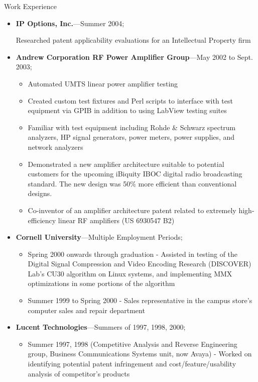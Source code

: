 \documentclass[10pt,oneside]{article}
\newenvironment{ressection}[1]{
	\vspace{4pt}
	{\Large#1}
	\begin{itemize}
	\vspace{3pt}
}{
	\end{itemize}
}
\newcommand{\ressubitem}[1]{
	\vspace{-1pt}
	\item \begin{flushleft} #1 \end{flushleft}
}
\newcommand{\resbigitem}[3]{
	\vspace{-5pt}
	\item
	\textbf{#1}---#2; \quad \textit{#3}
}
\newenvironment{ressubsec}[3]{
	\resbigitem{#1}{#2}{#3}
	\vspace{-2pt}
	\begin{itemize}
}{
	\end{itemize}
}
\newenvironment{ressection}[1]{
	\vspace{4pt}
	{\fontfamily{phv}\selectfont\Large#1}
	\begin{itemize}[leftmargin=12pt]
	\vspace{3pt}
}{
	\end{itemize}
}
\newcommand{\ressubitem}[1]{
	\vspace{-1pt}
	\item \begin{flushleft} #1 \end{flushleft}
}
\newcommand{\resbigitem}[2]{
	\vspace{-5pt}
	\item
	\textbf{#1}---\textit{#2}
}
\newenvironment{ressubsec}[2]{
	\resbigitem{#1}{#2}
	\vspace{-2pt}
	\begin{itemize}[leftmargin=12pt]
	}{
	\end{itemize}
	\vfil\penalty-50\vfilneg
}
\begin{document}
\begin{ressection}{Work Experience}
	\begin{ressubsec}{IP Options, Inc.}{Summer 2004}
		\ressubitem{Researched patent applicability evaluations for an Intellectual Property firm}
	\end{ressubsec}

	\begin{ressubsec}{Andrew Corporation RF Power Amplifier Group}{May 2002 to Sept. 2003}
		\ressubitem{Developed new amplifier architectures}
	    \ressubitem{Automated UMTS linear power amplifier testing}
		\ressubitem{Created custom test fixtures and Perl scripts to interface with test equipment via GPIB in addition to using LabView testing suites}
		\ressubitem{Familiar with test equipment including Rohde \& Schwarz spectrum analyzers, HP signal generators, power meters, power supplies, and network analyzers}
		\ressubitem{Demonstrated a new amplifier architecture suitable to potential customers for the upcoming iBiquity IBOC digital radio broadcasting standard. The new design was 50\% more efficient than conventional designs.}
		\ressubitem{Co-inventor of an amplifier architecture patent related to extremely high-efficiency linear RF amplifiers (US 6930547 B2)}
	\end{ressubsec}

	\begin{ressubsec}{Cornell University}{Multiple Employment Periods}
	  	\ressubitem{Summer 2001 - Assisted in the design of a digital receiver for Cornell University's CUPRI radar system using the Analog Devices AD6620 digital downconverter device and a National Instruments PCI-DIO-32HS digital I/O card}
	  	\ressubitem{Spring 2000 onwards through graduation - Assisted in testing of the Digital Signal Compression and Video Encoding Research (DISCOVER) Lab's CU30 algorithm on Linux systems, and implementing MMX optimizations in some portions of the algorithm}
        \ressubitem{Summer 1999 to Spring 2000 - Sales representative in the campus store's computer sales and repair department}
	\end{ressubsec}

	\begin{ressubsec}{Lucent Technologies}{Summers of 1997, 1998, 2000}
	  	\ressubitem{2000 (Silicon Processing Research Group) Independently created a CGI front-end to a simulation tool and software to process an ion implantation simulator output. Independently initiated a port of simulation tools from older Unix variants to Linux so that extensive simulation could be done on a low end machine to meet deadlines.}
        \ressubitem{Summer 1997, 1998 (Competitive Analysis and Reverse Engineering group, Business Communications Systems unit, now Avaya) - Worked on identifying potential patent infringement and cost/feature/usability analysis of competitor's products}
	\end{ressubsec}

\end{ressection}
\end{document}
